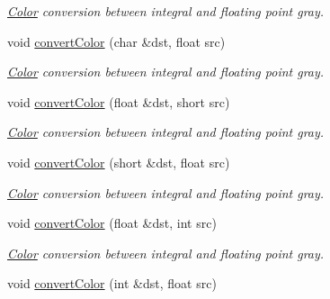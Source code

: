 \begin{DoxyCompactItemize}
\begin{DoxyCompactList}\small\item\em \hyperlink{class_d_o_1_1_color}{Color} conversion between integral and floating point gray. \end{DoxyCompactList}\item 
\hypertarget{group___color_conversion_ga771ff14c748a8b73de71819dadb4d33e}{void \hyperlink{group___color_conversion_ga771ff14c748a8b73de71819dadb4d33e}{convert\-Color} (char \&dst, float src)}\label{group___color_conversion_ga771ff14c748a8b73de71819dadb4d33e}

\begin{DoxyCompactList}\small\item\em \hyperlink{class_d_o_1_1_color}{Color} conversion between integral and floating point gray. \end{DoxyCompactList}\item 
\hypertarget{group___color_conversion_gac0e2de0ed7e83cf04856e237f6562255}{void \hyperlink{group___color_conversion_gac0e2de0ed7e83cf04856e237f6562255}{convert\-Color} (float \&dst, short src)}\label{group___color_conversion_gac0e2de0ed7e83cf04856e237f6562255}

\begin{DoxyCompactList}\small\item\em \hyperlink{class_d_o_1_1_color}{Color} conversion between integral and floating point gray. \end{DoxyCompactList}\item 
\hypertarget{group___color_conversion_ga9db0741b322244e6857ed7cfd3360620}{void \hyperlink{group___color_conversion_ga9db0741b322244e6857ed7cfd3360620}{convert\-Color} (short \&dst, float src)}\label{group___color_conversion_ga9db0741b322244e6857ed7cfd3360620}

\begin{DoxyCompactList}\small\item\em \hyperlink{class_d_o_1_1_color}{Color} conversion between integral and floating point gray. \end{DoxyCompactList}\item 
\hypertarget{group___color_conversion_gacf105c01bcb8c0fb4fa40c42c61b34c5}{void \hyperlink{group___color_conversion_gacf105c01bcb8c0fb4fa40c42c61b34c5}{convert\-Color} (float \&dst, int src)}\label{group___color_conversion_gacf105c01bcb8c0fb4fa40c42c61b34c5}

\begin{DoxyCompactList}\small\item\em \hyperlink{class_d_o_1_1_color}{Color} conversion between integral and floating point gray. \end{DoxyCompactList}\item 
\hypertarget{group___color_conversion_ga5b08468b51bbfdf4c1126d01ba7b1228}{void \hyperlink{group___color_conversion_ga5b08468b51bbfdf4c1126d01ba7b1228}{convert\-Color} (int \&dst, float src)}\label{group___color_conversion_ga5b08468b51bbfdf4c1126d01ba7b1228}


\end{DoxyCompactItemize}
